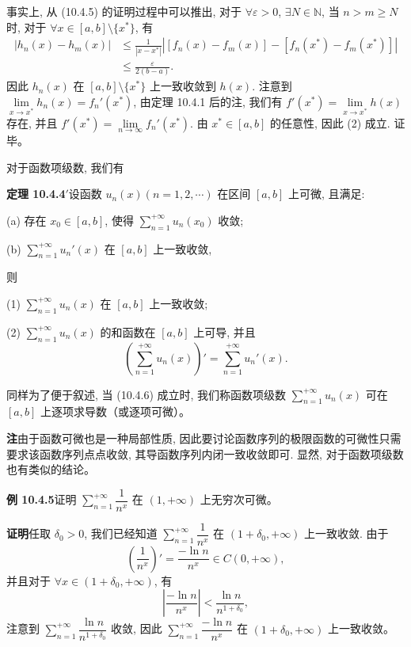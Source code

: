 \documentclass[UTF8,12pt,a4paper,fontset=fandol]{ctexart}
\begin{document}
事实上, 从 (10.4.5) 的证明过程中可以推出, 对于 $\forall\varepsilon>0$, $\exists N\in\mathbb N$, 当 $n>m\geq N$ 时, 对于 $\forall x\in[a,b]\setminus\{x^*\}$, 有
\[
\begin{aligned}
  |h_n(x)-h_m(x)|
  &\leq \frac1{|x-x^*|}\left|[f_n(x)-f_m(x)]-[f_n(x^*)-f_m(x^*)]\right|\\
  &\leq\frac{\varepsilon}{2(b-a)}.
\end{aligned}
\]
因此 $h_n(x)$ 在 $[a,b]\setminus\{x^*\}$ 上一致收敛到 $h(x)$. 注意到 $\lim\limits_{x\to x^*}h_n(x)=f_n'(x^*)$, 由定理 10.4.1 后的注, 我们有 $f'(x^*)=\lim\limits_{x\to x^*}h(x)$ 存在, 并且 $f'(x^*)=\lim\limits_{n\to\infty}f_n'(x^*)$. 由 $x^*\in[a,b]$ 的任意性, 因此 (2) 成立. 证毕。

对于函数项级数, 我们有

\noindent\textbf{定理 10.4.4$'$}\quad 设函数 $u_n(x)(n=1,2,\cdots)$ 在区间 $[a,b]$ 上可微, 且满足:

(a) 存在 $x_0\in[a,b]$, 使得 $\sum\limits_{n=1}^{+\infty}u_n(x_0)$ 收敛;

(b) $\sum\limits_{n=1}^{+\infty}u_n'(x)$ 在 $[a,b]$ 上一致收敛,

则

(1) $\sum\limits_{n=1}^{+\infty}u_n(x)$ 在 $[a,b]$ 上一致收敛;

(2) $\sum\limits_{n=1}^{+\infty}u_n(x)$ 的和函数在 $[a,b]$ 上可导, 并且
\begin{equation}
  \left(\sum_{n=1}^{+\infty}u_n(x)\right)'
  =\sum_{n=1}^{+\infty}u_n'(x).
  \tag{10.4.6}
\end{equation}

同样为了便于叙述, 当 (10.4.6) 成立时, 我们称函数项级数 $\sum\limits_{n=1}^{+\infty}u_n(x)$ 可在 $[a,b]$ 上逐项求导数（或逐项可微）。

\noindent\textbf{注}\quad 由于函数可微也是一种局部性质, 因此要讨论函数序列的极限函数的可微性只需要求该函数序列点点收敛, 其导函数序列内闭一致收敛即可. 显然, 对于函数项级数也有类似的结论。

\noindent\textbf{例 10.4.5}\quad 证明 $\sum\limits_{n=1}^{+\infty}\dfrac1{n^x}$ 在 $(1,+\infty)$ 上无穷次可微。

\noindent\textbf{证明}\quad 任取 $\delta_0>0$, 我们已经知道 $\sum\limits_{n=1}^{+\infty}\dfrac1{n^x}$ 在 $(1+\delta_0,+\infty)$ 上一致收敛. 由于
\[
  \left(\frac1{n^x}\right)'=\frac{-\ln n}{n^x}\in C(0,+\infty),
\]
并且对于 $\forall x\in(1+\delta_0,+\infty)$, 有
\[
  \left|\frac{-\ln n}{n^x}\right|<\frac{\ln n}{n^{1+\delta_0}},
\]
注意到 $\sum\limits_{n=1}^{+\infty}\dfrac{\ln n}{n^{1+\delta_0}}$ 收敛, 因此 $\sum\limits_{n=1}^{+\infty}\dfrac{-\ln n}{n^x}$ 在 $(1+\delta_0,+\infty)$ 上一致收敛。
\end{document}

